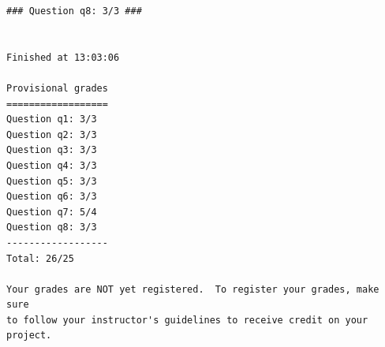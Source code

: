 \documentclass{report}
\begin{document}
\begin{lstlisting}
### Question q8: 3/3 ###


Finished at 13:03:06

Provisional grades
==================
Question q1: 3/3
Question q2: 3/3
Question q3: 3/3
Question q4: 3/3
Question q5: 3/3
Question q6: 3/3
Question q7: 5/4
Question q8: 3/3
------------------
Total: 26/25

Your grades are NOT yet registered.  To register your grades, make sure
to follow your instructor's guidelines to receive credit on your project.
          \end{lstlisting}
\end{document}
